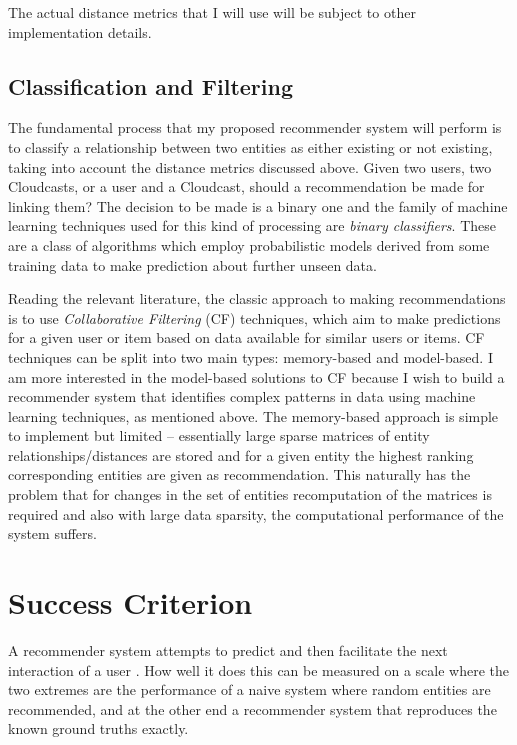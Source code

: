 The actual distance metrics that I will use will be subject to other implementation details. 

\subsection*{Classification and Filtering}

The fundamental process that my proposed recommender system will perform is to classify a relationship between two entities as either existing or not existing, taking into account the distance metrics discussed above. Given two users, two Cloudcasts, or a user and a Cloudcast, should a recommendation be made for linking them? The decision to be made is a binary one and the family of machine learning techniques used for this kind of processing are \emph{binary classifiers}. These are a class of algorithms which employ probabilistic models derived from some training data to make prediction about further unseen data.

Reading the relevant literature, the classic approach to making recommendations is to use \emph{Collaborative Filtering} (CF) techniques, which aim to make predictions for a given user or item based on data available for similar users or items. CF techniques can be split into two main types: memory-based and model-based. I am more interested in the model-based solutions to CF because I wish to build a recommender system that identifies complex patterns in data using machine learning techniques, as mentioned above. The memory-based approach is simple to implement but limited -- essentially large sparse matrices of entity relationships/distances are stored and for a given entity the highest ranking corresponding entities are given as recommendation. This naturally has the problem that for changes in the set of entities recomputation of the matrices is required and also with large data sparsity, the computational performance of the system suffers.

\section{Success Criterion}

A recommender system attempts to predict and then facilitate the next interaction of a user \cite{analysis_recsys_algs}. How well it does this can be measured on a scale where the two extremes are the performance of a naive system where random entities are recommended, and at the other end a recommender system that reproduces the known ground truths exactly. 


